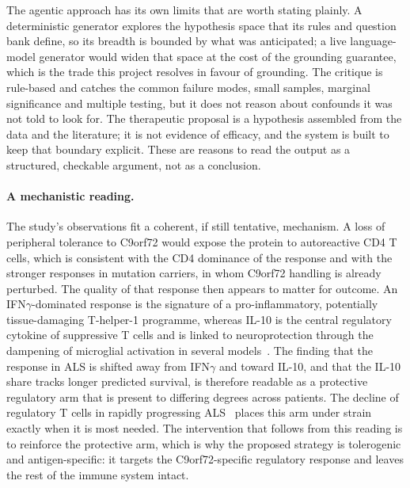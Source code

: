 \documentclass[11pt]{article}
\begin{document}
The agentic approach has its own limits that are worth stating plainly. A deterministic generator
explores the hypothesis space that its rules and question bank define, so its breadth is bounded by
what was anticipated; a live language-model generator would widen that space at the cost of the
grounding guarantee, which is the trade this project resolves in favour of grounding. The critique
is rule-based and catches the common failure modes, small samples, marginal significance and
multiple testing, but it does not reason about confounds it was not told to look for. The therapeutic
proposal is a hypothesis assembled from the data and the literature; it is not evidence of efficacy,
and the system is built to keep that boundary explicit. These are reasons to
read the output as a structured, checkable argument, not as a conclusion.

\paragraph{A mechanistic reading.}
The study's observations fit a coherent, if still tentative, mechanism. A loss of peripheral
tolerance to C9orf72 would expose the protein to autoreactive CD4 T cells, which is consistent with
the CD4 dominance of the response and with the stronger responses in mutation carriers, in whom
C9orf72 handling is already perturbed. The quality of that response then appears to matter for
outcome. An IFN$\gamma$-dominated response is the signature of a pro-inflammatory, potentially
tissue-damaging T-helper-1 programme, whereas IL-10 is the central regulatory cytokine of
suppressive T cells and is linked to neuroprotection through the dampening of microglial activation
in several models~\citep{runge2020,laffer2019,bido2024}. The finding that the response in ALS is
shifted away from IFN$\gamma$ and toward IL-10, and that the IL-10 share tracks longer predicted
survival, is therefore readable as a protective regulatory arm that is present to differing degrees
across patients. The decline of regulatory T cells in rapidly progressing ALS~\citep{appel2012}
places this arm under strain exactly when it is most needed. The intervention that follows from this
reading is to reinforce the protective arm, which is why the proposed strategy is tolerogenic and
antigen-specific: it targets the C9orf72-specific regulatory response and leaves the rest of the
immune system intact.
\end{document}

